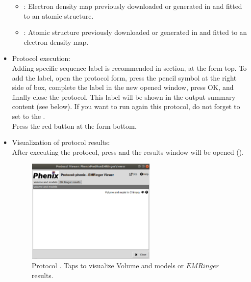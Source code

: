 \begin{itemize}
    \begin{itemize}
     \item {}: Electron density map previously downloaded or generated in \scipion and fitted to an atomic structure.
     \item {}: Atomic structure previously downloaded or generated in \scipion and fitted to an electron density map.\
    \end{itemize}
    
 \item Protocol execution:\\

  Adding specific sequence label is recommended in  section, at the form top. To add the label, open the protocol form, press the pencil symbol at the right side of  box, complete the label in the new opened window, press OK, and finally close the protocol. This label will be shown in the output summary content (see below). If you want to run again this protocol, do not forget to set to  the .\\
  Press the \ttt{Execute} red button at the form bottom.\\
  
 \item Visualization of protocol results:\\
  
  After executing the protocol, press  and the results window will be opened ().\\ 
  
  \begin{figure}[H]
     \centering 
     \captionsetup{width=.7\linewidth} 
     \includegraphics[width=0.60\textwidth]{Images_appendix/Fig140.pdf}
     \caption{Protocol \scommand{phenix - emringer}. Taps to visualize Volume and models or $EMRinger$ results.}
     \label{fig:app_protocol_emringer_2}
    \end{figure}
    

\end{itemize}
